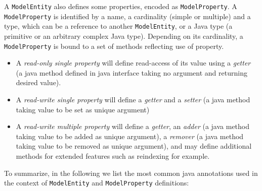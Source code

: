 A \texttt{ModelEntity} also defines some properties, encoded as \texttt{ModelProperty}. A \texttt{ModelProperty} is identified by a name, a cardinality (simple or multiple) and a type, which can be a reference to another \texttt{ModelEntity}, or a Java type (a primitive or an arbitrary complex Java type). Depending on its cardinality, a \texttt{ModelProperty} is bound to a set of methods reflecting use of property.
\begin{itemize}
    \item A \emph{read-only single property} will define read-access of its value using a \emph{getter} (a java method defined in java interface taking no argument and returning desired value).
    \item A \emph{read-write single property} will define a \emph{getter} and a \emph{setter} (a java method taking value to be set as unique argument)
    \item A \emph{read-write multiple property} will define a \emph{getter}, an \emph{adder} (a java method taking value to be added as unique argument), a \emph{remover} (a java method taking value to be removed as unique argument), and may define additional methods for extended features such as reindexing for example.
\end{itemize}


To summarize, in the following we list the most common java annotations used in the context of \texttt{ModelEntity} and \texttt{ModelProperty} definitions:

